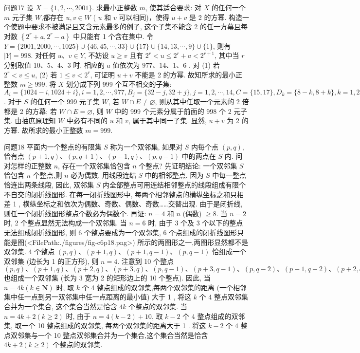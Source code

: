 问题17 设 $X=\{1,2, \cdots, 2001\}$. 求最小正整数 $m$, 使其适合要求: 对 $X$ 的任何一个 $m$ 元子集 $W$,都存在 $u, v \in W$ ( $u$ 和 $v$ 可以相同)，使得 $u+v$ 是 2 的方幂.
构造一个使题中要求不被满足且又含元素最多的例子, 这个子集不能含 2 的任一方幕且每对数 $\left\{2^r+a, 2^r-a\right\}$ 中只能有 1 个含在集中.
令 $Y=\{2001,2000, \cdots, 1025\} \cup\{46,45, \cdots, 33\} \cup\{17\} \cup\{14,13, \cdots, 9\} \cup \{1\}$, 则有 $|Y|=998$. 对任何 $u 、 v \in Y$, 不妨设 $u \geqslant v$ 且有 $2^r<u \leqslant 2^r+ a<2^{r+1}$, 其中当 $r$ 分别取值 10、5、4、3 时, 相应的 $a$ 值依次为 $977 、 14 、 1 、 6$ . 对 (1) 若 $2^r<v \leqslant u$, (2) 若 $1 \leqslant v<2^r$, 可证明 $u+v$ 不能是 2 的方幂.
故知所求的最小正整数 $m \geqslant 999$.
将 $X$ 划分成下列 999 个互不相交的子集: $A_i=\{1024-i, 1024+i\}, i= 1,2, \cdots, 977, B_j=\{32-j, 32+j\}, j=1,2, \cdots, 14, C=\{15,17\}, D_k=\{8-k, 8+k\}, k=1,2, \cdots, 6, E=\{1,8,16,32,1024\}$. 对于 $S$ 的任何一个 999 元子集 $W$, 若 $W \cap E \neq \varnothing$, 则从其中任取一个元素的 2 倍都是 2 的方幕; 若 $W \cap E=\varnothing$, 则 $W$ 中的 999 个元素分属于前面的 998 个 2 元子集.
由抽庶原理知 $W$ 中必有不同的 $u$ 和 $v$, 属于其中同一子集.
显然, $u+v$ 为 2 的方幂.
故所求的最小正整数 $m=999$.



问题18 平面内一个整点的有限集 $S$ 称为一个双邻集, 如果对 $S$ 内每个点 $(p, q)$, 恰有点 $(p+1, q) 、(p, q+1) 、(p-1, q) 、(p, q-1)$ 中的两点在 $S$ 内.
问对怎样的正整数 $n$, 存在一个双邻集恰包含 $n$ 个整点?
先证明结论: 一个双邻集 $S$ 恰包含 $n$ 个整点,则 $n$ 必为偶数.
用线段连结 $S$ 中的相邻整点.
因为 $S$ 中每一整点恰连出两条线段, 因此, 双邻集 $S$ 内全部整点可用连结相邻整点的线段组成有限个不自交的闭折线图形.
在每一闭折线图形中, 每两个相邻整点的横纵坐标之和只相差 1 , 横纵坐标之和依次为偶数、奇数、偶数、奇数……交替出现.
由于是闭折线, 则任一个闭折线图形整点个数必为偶数个.
再证: $n=4$ 和 $n$ (偶数) $\geqslant 8$.
当 $n=2$ 时, 2 个整点显然无法构成一个双邻集.
当 $n=6$ 时, 由于 3 个及 3 个以下的整点无法组成闭折线图形, 则 6 个整点要成为一个双邻集, 6 个点组成的闭折线图形只能是图(<FilePath:./figures/fig-c6p18.png>) 所示的两图形之一,两图形显然都不是双邻集.
4 个整点 $(p, q) 、(p+1, q) 、(p+1, q-1) 、(p, q-1)$ 恰组成一个双邻集 (边长为 1 的正方形), 则 $n=4$.
注意到 10 个整点 $(p, q) 、(p+1, q) 、(p+2, q) 、(p+3, q) 、(p, q- 1) 、(p+3, q-1) 、(p, q-2) 、(p+1, q-2) 、(p+2, q-2) 、(p+3, q-2)$ 也组成一个双邻集 (长为 3 宽为 2 的矩形边上的 10 个整点).
因此, 当 $n=4 k(k \in \mathbf{N})$ 时, 取 $k$ 个 4 整点组成的双邻集,每两个双邻集的距离 (一个相邻集中任一点到另一双邻集中任一点距离的最小值) 大于 1 , 将这 $k$ 个 4 整点双邻集合并为一个集合, 这个集合当然是恰含 $4 k$ 个整点的双邻集.
当 $n=4 k+2(k \geqslant 2)$ 时, 由于 $n=4(k-2)+10$, 取 $k-2$ 个 4 整点组成的双邻集, 取一个 10 整点组成的双邻集, 每两个双邻集的距离大于 1 . 将这 $k-2$ 个 4 整点双邻集与一个 10 整点双邻集合并为一个集合,这个集合当然是恰含 $4 k+2(k \geqslant 2)$ 个整点的双邻集.



